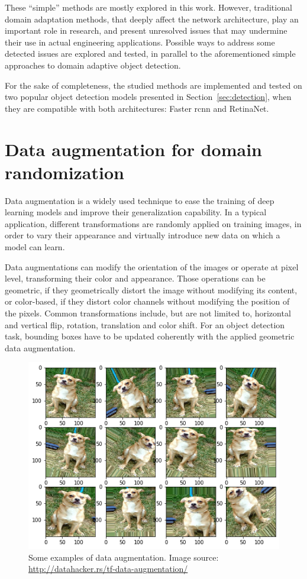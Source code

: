 \documentclass[%
    corpo=12pt,
    twoside,
    stile=classica,   
    tipotesi=magistrale,
    evenboxes,
    english,
	numerazioneromana,
]{toptesi}
\newcommand{\quotes}[1]{``#1''}
\begin{document}
\bigskip
These \quotes{simple} methods are mostly explored in this work. However, traditional domain adaptation methods, that deeply affect the network architecture, play an important role in research, and present unresolved issues that may undermine their use in actual engineering applications. Possible ways to address some detected issues are explored and tested, in parallel to the aforementioned simple approaches to domain adaptive object detection.

\bigskip
For the sake of completeness, the studied methods are implemented and tested on two popular object detection models presented in Section~\ref{sec:detection}, when they are compatible with both architectures: Faster \gls{rcnn} and RetinaNet.

\section{Data augmentation for domain randomization}\label{sec:dataaug}
Data augmentation is a widely used technique to ease the training of deep learning models and improve their generalization capability. In a typical application, different transformations are randomly applied on training images, in order to vary their appearance and virtually introduce new data on which a model can learn.

Data augmentations can modify the orientation of the images or operate at pixel level, transforming their color and appearance. Those operations can be geometric, if they geometrically distort the image without modifying its content, or color-based, if they distort color channels without modifying the position of the pixels. Common transformations include, but are not limited to, horizontal and vertical flip, rotation, translation and color shift. For an object detection task, bounding boxes have to be updated coherently with the applied geometric data augmentation.

\begin{figure}[ht!]
	\centering
	\includegraphics[width=0.8\linewidth]{imgs/augmentation.png}
	\caption[Some examples of data augmentation]{Some examples of data augmentation. Image source: \url{http://datahacker.rs/tf-data-augmentation/}}
	\label{fig:augmentation}
\end{figure}
\end{document}
